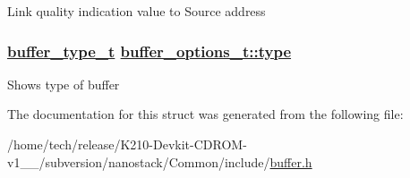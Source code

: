 Link quality indication value to Source address \hypertarget{structbuffer__options__t_d445f5550a95e734c8598f77a98147a5}{
\subsubsection[type]{\setlength{\rightskip}{0pt plus 5cm}\hyperlink{buffer_8h_1ee2fd526bf1d6e6d892b10466c7e725}{buffer\_\-type\_\-t} \hyperlink{structbuffer__options__t_d445f5550a95e734c8598f77a98147a5}{buffer\_\-options\_\-t::type}}}
\label{structbuffer__options__t_d445f5550a95e734c8598f77a98147a5}


Shows type of buffer 

The documentation for this struct was generated from the following file:\begin{CompactItemize}
\item 
/home/tech/release/K210-Devkit-CDROM-v1\_\_/subversion/nanostack/Common/include/\hyperlink{buffer_8h}{buffer.h}\end{CompactItemize}
